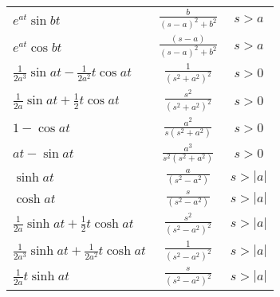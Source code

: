 \documentclass[a4paper]{article}
\begin{document}
\begin{center}
\begin{tabular}{llcccc}
		\multicolumn{2}{l}{$\displaystyle e^{at} \sin bt$} & \multicolumn{2}{c}{$\displaystyle \frac{b}{(s - a)^2 + b^2}$} & \multicolumn{2}{c}{$s > a$} \\



		\multicolumn{2}{l}{$\displaystyle e^{at} \cos bt$} & \multicolumn{2}{c}{$\displaystyle \frac{(s-a)}{(s - a)^2 + b^2}$} & \multicolumn{2}{c}{$s > a$} \\

		
		\multicolumn{2}{l}{$\displaystyle \frac{1}{2a^3} \sin at - \frac{1}{2a^2} t \cos at$} & \multicolumn{2}{c}{$\displaystyle \frac{1}{(s^2 + a^2)^2 }$} & \multicolumn{2}{c}{$s > 0$} \\

		\multicolumn{2}{l}{$\displaystyle \frac{1}{2a} \sin at + \frac{1}{2} t \cos at$} & \multicolumn{2}{c}{$\displaystyle \frac{s^2}{(s^2 + a^2)^2 }$} & \multicolumn{2}{c}{$s > 0$} \\
		\multicolumn{2}{l}{$\displaystyle 1 - \cos at$} & \multicolumn{2}{c}{$\displaystyle \frac{a^2}{s(s^2 + a^2) }$} & \multicolumn{2}{c}{$s > 0$} \\

		\multicolumn{2}{l}{$\displaystyle at - \sin at$} & \multicolumn{2}{c}{$\displaystyle \frac{a^3}{s^{2}(s^2 + a^2) }$} & \multicolumn{2}{c}{$s > 0$} \\

		\multicolumn{2}{l}{$\displaystyle \sinh at $} & \multicolumn{2}{c}{$\displaystyle \frac{a}{(s^2 - a^2) }$} & \multicolumn{2}{c}{$s > |a|$} \\
		
		\multicolumn{2}{l}{$\displaystyle \cosh at $} & \multicolumn{2}{c}{$\displaystyle \frac{s}{(s^2 - a^2) }$} & \multicolumn{2}{c}{$s > |a|$} \\
		

		\multicolumn{2}{l}{$\displaystyle \frac{1}{2a} \sinh at + \frac{1}{2} t \cosh at$} & \multicolumn{2}{c}{$\displaystyle \frac{s^2}{(s^2 - a^2)^2 }$} & \multicolumn{2}{c}{$s > |a|$} \\

		\multicolumn{2}{l}{$\displaystyle \frac{1}{2a^3} \sinh at + \frac{1}{2a^2} t \cosh at$} & \multicolumn{2}{c}{$\displaystyle \frac{1}{(s^2 - a^2)^2 }$} & \multicolumn{2}{c}{$s > |a|$} \\

		\multicolumn{2}{l}{$\displaystyle \frac{1}{2a}t \sinh at$} & \multicolumn{2}{c}{$\displaystyle \frac{s}{(s^2 - a^2)^2 }$} & \multicolumn{2}{c}{$s > |a|$} \\



\end{tabular}
\end{center}
\end{document}
